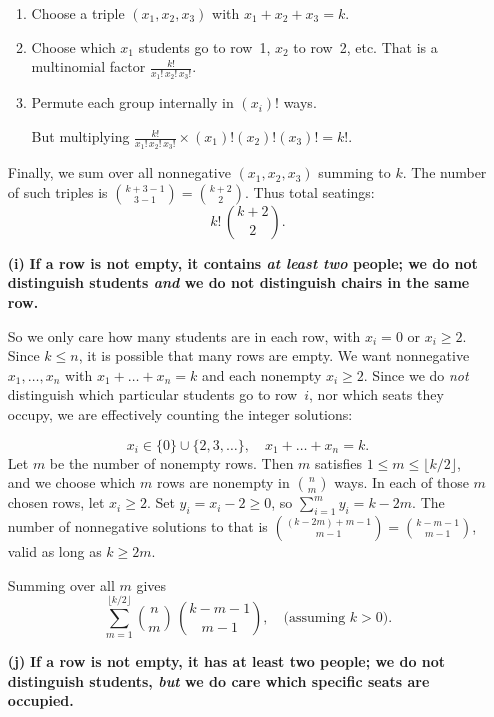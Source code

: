 \documentclass[docmute]{article}
\begin{document}
\begin{enumerate}
    \begin{enumerate}
      \item Choose a triple \((x_1,x_2,x_3)\) with $x_1+x_2+x_3 = k$.
      \item Choose which $x_1$ students go to row~1, $x_2$ to row~2, etc.  That is a multinomial factor $\frac{k!}{x_1!\,x_2!\,x_3!}$.
      \item Permute each group internally in $(x_i)!$ ways.

      But multiplying $\frac{k!}{x_1!\,x_2!\,x_3!}\times (x_1)!(x_2)!(x_3)! = k!.$
    \end{enumerate}

    Finally, we sum over all nonnegative $(x_1,x_2,x_3)$ summing to $k$.  The number of such triples is $\binom{k+3-1}{3-1} = \binom{k+2}{2}.$  Thus total seatings:
    \[
      k!\,\binom{k+2}{2}.
    \]

  \item[\textbf{(i)}]
    \textbf{If a row is not empty, it contains \emph{at least two} people; we do not distinguish students \emph{and} we do not distinguish chairs in the same row.}

    So we only care how many students are in each row, with $x_i=0$ or $x_i\ge2$.  Since $k\le n$, it is possible that many rows are empty.  We want nonnegative $x_1,\dots,x_n$ with $x_1+\dots+x_n = k$ and each nonempty $x_i\ge2$.  Since we do \emph{not} distinguish which particular students go to row~$i$, nor which seats they occupy, we are effectively counting the integer solutions:

    \[
      x_i \in \{0\}\cup \{2,3,\dots\}, 
      \quad x_1+\dots+x_n = k.
    \]
    Let $m$ be the number of nonempty rows.  Then $m$ satisfies $1 \le m \le \lfloor k/2 \rfloor$, and we choose which $m$ rows are nonempty in $\binom{n}{m}$ ways.  In each of those $m$ chosen rows, let $x_i \ge2$.  Set $y_i = x_i - 2 \ge 0$, so $\sum_{i=1}^m y_i = k - 2m.$  The number of nonnegative solutions to that is $\binom{(k-2m) + m -1}{m-1} = \binom{k - m -1}{m-1}$, valid as long as $k \ge 2m.$  

    Summing over all $m$ gives
    \[
      \sum_{m=1}^{\lfloor k/2 \rfloor}
        \binom{n}{m}\,\binom{k - m - 1}{m-1},
      \quad
      \text{(assuming $k>0$).}
    \]

  \item[\textbf{(j)}]
    \textbf{If a row is not empty, it has at least two people; we do not distinguish students, \emph{but} we do care which specific seats are occupied.}




\end{enumerate}
\end{document}
